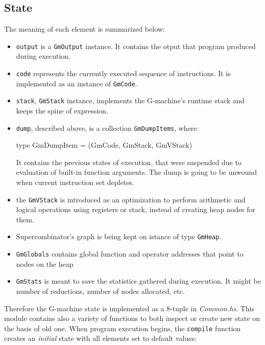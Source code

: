 \documentclass[12pt,a4paper]{report}
\begin{document}
\subsection{State}
The meaning of each element is summarized below:
\begin{itemize}
  \item \texttt{output} is a \texttt{GmOutput} instance. It contains the otput
    that program produced during execution.
  \item \texttt{code} represents the currently executed sequence of
    instructions. It is implemented as an instance of \texttt{GmCode}.
  \item \texttt{stack}, \texttt{GmStack} instance, implements the G-machine's runtime
    stack and keeps the spine of expression.
  \item \texttt{dump}, described above, is a collection \texttt{GmDumpItems},
    where:

    \vspace*{0.2in}
    \begin{code}[style=haskell]
      type GmDumpItem = (GmCode, GmStack, GmVStack)
    \end{code}

    It contains the previous states of execution, that were suspended due to
    evaluation of built-in function arguments. The dump is going to be unwound
    when current instruction set depletes.
  \item the \texttt{GmVStack} is introduced as an optimization to perform
    arithmetic and logical operations using registers or stack, instead of creating
    heap nodes for them.
  \item Supercombinator's graph is being kept on istance of type
    \texttt{GmHeap}.
  \item \texttt{GmGlobals} contains global function and operator addresses that
    point to nodes on the heap
  \item \texttt{GmStats} is meant to save the statistics gathered during
    execution. It might be number of reductions, number of nodes allocated,
    etc.

\end{itemize}

Therefore the G-machine state is implemented as a 8-tuple in
\textit{Common.hs}. This module contains also a variety of functions to both
inspect or create new state on the basis of old one. When program execution
begins, the \texttt{compile} function creates an \textit{initial} state with
all elements set to default values:
\end{document}
